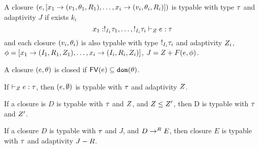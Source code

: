 \begin{defn}[Typable]
  \label{typable}
  A closure $( e, [ x_1 \to (v_1 ,  \theta_1 , R_1 ) , \ldots, x_i \to (v_i, \theta_i, R_i )] )$ is typable with type $\tau$ and adaptivity $J$ if exists $k_i$\\
  \[
     x_1 : !_{I_1} \tau_1, \ldots, !_{I_i} \tau_i 
     \vdash_{Z}  e : \tau  \]
   and each closure $(v_i, \theta_i)$  is also typable with type $!_{I_i} \tau_i$ and adaptivity $Z_i$, $ \phi = [x_1
     \to (I_1, R_1, Z_1), \ldots,  x_i \to (I_i, R_i,
     Z_i)  ] $,  $J = Z + F( e, \phi ) $.
 \end{defn}

 \begin{defn}[ClosedClosure]
  \label{closure}
   A closure $(e, \theta)$ is closed if $\mathsf{FV} (e) \subseteq \mathtt{dom}(\theta)$. 
 \end{defn}

 

\begin{lem}[programTypable]
  \label{proglemma}
   If $ \vdash_{Z}   e : \tau $, then $(
     e, \emptyset ) $ is typable with $\tau$ and adaptivity $Z$. 
   \end{lem}

   \begin{lem}[TypableMono]
     \label{tmono}
     If a closure is $D$ is typable with $\tau$ and $Z$, and $Z \leq Z'$, then
     D is typable with $\tau$ and $Z'$.
    \end{lem} 

   
\begin{lem}[TypableSoundness]
  \label{tsound}
  If a closure $D$ is typable with $\tau$ and $J$, and $D \mathrel{\to^{R}} E$, then
    closure $E$ is typable with $\tau$ and adaptivity $J - R$. 
   \end{lem}

